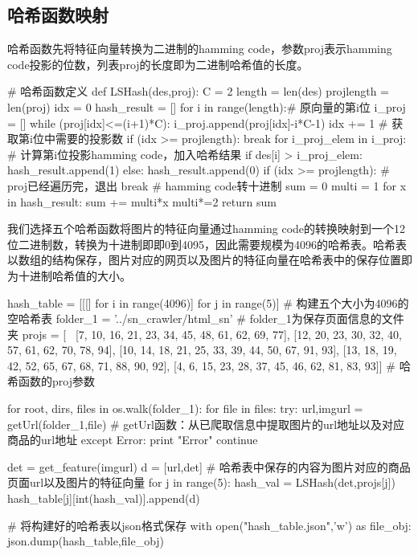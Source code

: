 \subsection{哈希函数映射}

哈希函数先将特征向量转换为二进制的hamming code，参数proj表示hamming code投影的位数，列表proj的长度即为二进制哈希值的长度。

\begin{python}
# 哈希函数定义
def LSHash(des,proj):
    C = 2
    length = len(des)
    projlength = len(proj)
    idx = 0
    hash_result = []
    for i in range(length):# 原向量的第i位
        i_proj = []
        while (proj[idx]<=(i+1)*C):
            i_proj.append(proj[idx]-i*C-1)
            idx += 1       # 获取第i位中需要的投影数
            if (idx >= projlength):
                break
        for i_proj_elem in i_proj:  # 计算第i位投影hamming code，加入哈希结果
            if des[i] > i_proj_elem:
                hash_result.append(1)
            else:
                hash_result.append(0)
        if (idx >= projlength):  # proj已经遍历完，退出
            break
    # hamming code转十进制
    sum = 0
    multi = 1
    for x in hash_result:
        sum += multi*x
        multi*=2
    return sum
\end{python}

我们选择五个哈希函数将图片的特征向量通过hamming code的转换映射到一个12位二进制数，转换为十进制即即0到4095，因此需要规模为4096的哈希表。哈希表以数组的结构保存，图片对应的网页以及图片的特征向量在哈希表中的保存位置即为十进制哈希值的大小。

\begin{python}
hash_table = [[[] for i in range(4096)] for j in range(5)] # 构建五个大小为4096的空哈希表
folder_1 = '../sn_crawler/html_sn' # folder_1为保存页面信息的文件夹
projs = [ \
    [7, 10, 16, 21, 23, 34, 45, 48, 61, 62, 69, 77], 
    [12, 20, 23, 30, 32, 40, 57, 61, 62, 70, 78, 94], 
    [10, 14, 18, 21, 25, 33, 39, 44, 50, 67, 91, 93], 
    [13, 18, 19, 42, 52, 65, 67, 68, 71, 88, 90, 92], 
    [4, 6, 15, 23, 28, 37, 45, 46, 62, 81, 83, 93]] # 哈希函数的proj参数

for root, dirs, files in os.walk(folder_1):
    for file in files:
        try:
            url,imgurl = getUrl(folder_1,file) # getUrl函数：从已爬取信息中提取图片的url地址以及对应商品的url地址
        except Error:
            print "Error"
            continue

        det = get_feature(imgurl)
        d = [url,det] # 哈希表中保存的内容为图片对应的商品页面url以及图片的特征向量
        for j in range(5):
            hash_val = LSHash(det,projs[j])
            hash_table[j][int(hash_val)].append(d)

# 将构建好的哈希表以json格式保存
with open("hash_table.json",'w') as file_obj:
    json.dump(hash_table,file_obj)
\end{python}

